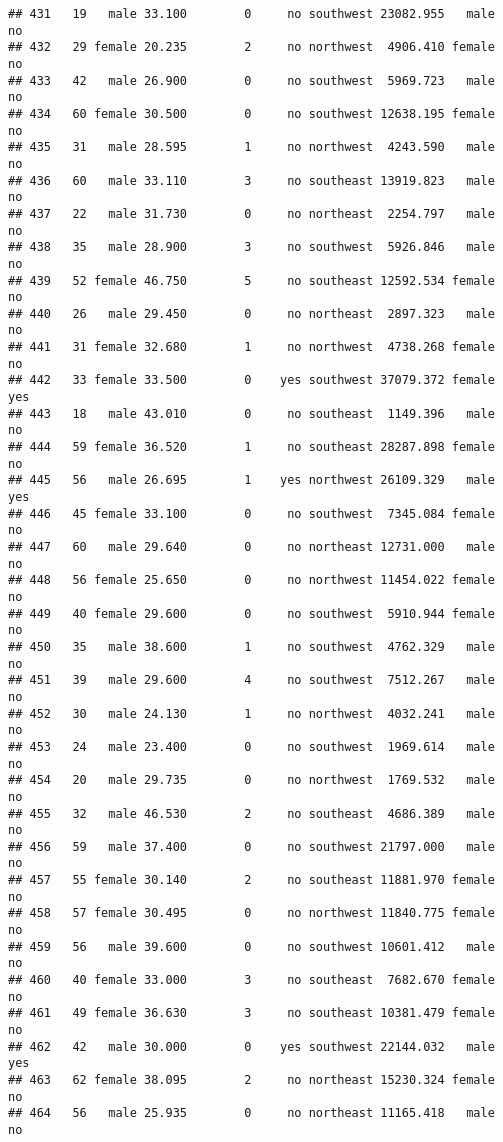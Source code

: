 \documentclass[
]{article}
\begin{document}
\begin{verbatim}
## 431   19   male 33.100        0     no southwest 23082.955   male       no
## 432   29 female 20.235        2     no northwest  4906.410 female       no
## 433   42   male 26.900        0     no southwest  5969.723   male       no
## 434   60 female 30.500        0     no southwest 12638.195 female       no
## 435   31   male 28.595        1     no northwest  4243.590   male       no
## 436   60   male 33.110        3     no southeast 13919.823   male       no
## 437   22   male 31.730        0     no northeast  2254.797   male       no
## 438   35   male 28.900        3     no southwest  5926.846   male       no
## 439   52 female 46.750        5     no southeast 12592.534 female       no
## 440   26   male 29.450        0     no northeast  2897.323   male       no
## 441   31 female 32.680        1     no northwest  4738.268 female       no
## 442   33 female 33.500        0    yes southwest 37079.372 female      yes
## 443   18   male 43.010        0     no southeast  1149.396   male       no
## 444   59 female 36.520        1     no southeast 28287.898 female       no
## 445   56   male 26.695        1    yes northwest 26109.329   male      yes
## 446   45 female 33.100        0     no southwest  7345.084 female       no
## 447   60   male 29.640        0     no northeast 12731.000   male       no
## 448   56 female 25.650        0     no northwest 11454.022 female       no
## 449   40 female 29.600        0     no southwest  5910.944 female       no
## 450   35   male 38.600        1     no southwest  4762.329   male       no
## 451   39   male 29.600        4     no southwest  7512.267   male       no
## 452   30   male 24.130        1     no northwest  4032.241   male       no
## 453   24   male 23.400        0     no southwest  1969.614   male       no
## 454   20   male 29.735        0     no northwest  1769.532   male       no
## 455   32   male 46.530        2     no southeast  4686.389   male       no
## 456   59   male 37.400        0     no southwest 21797.000   male       no
## 457   55 female 30.140        2     no southeast 11881.970 female       no
## 458   57 female 30.495        0     no northwest 11840.775 female       no
## 459   56   male 39.600        0     no southwest 10601.412   male       no
## 460   40 female 33.000        3     no southeast  7682.670 female       no
## 461   49 female 36.630        3     no southeast 10381.479 female       no
## 462   42   male 30.000        0    yes southwest 22144.032   male      yes
## 463   62 female 38.095        2     no northeast 15230.324 female       no
## 464   56   male 25.935        0     no northeast 11165.418   male       no

\end{verbatim}
\end{document}
